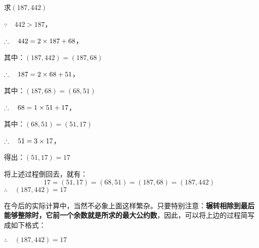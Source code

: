 \begin{example}
求$(187, 442)$    
\end{example}

\begin{solution}
$\because\quad 442>187$，

\begin{multicols}{2}
  \begin{center}
  \end{center}  

$\therefore\quad 442=2\times 187+68$，

其中：$(187,442)=(187,68)$

\begin{center}
\end{center}

$\therefore\quad 187=2\times 68+51$，

其中：$(187,68)=(68,51)$

\begin{center}
\end{center}

$\therefore\quad 68=1\times 51+17$，

其中：$(68,51)=(51,17)$

\begin{center}
\end{center}

$\therefore\quad 51=3\times 17$，

得出：$(51,17)=17$
\end{multicols}

将上述过程倒回去，就有：
\[17= (51, 17) = (68, 51) = (187, 68) = (187, 442)\] 
$\therefore\quad  (187, 442) =17$
\end{solution}


在今后的实际计算中，当然不必象上面这样繁杂。只要特别注意：\textbf{辗转相除到最后能够整除时，它前一个余数就是所求的最大公约数}，因此，可以将上边的过程简写成如下格式：
\begin{center}
\end{center}
$\therefore\quad (187,442)=17$



